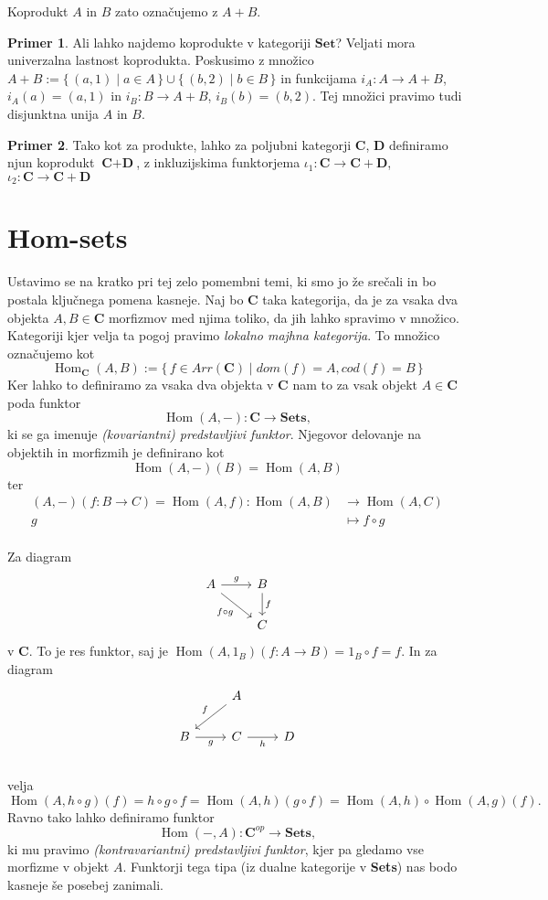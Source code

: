 \documentclass[12pt,a4paper]{book}
\theoremstyle{definition}
\theoremstyle{plain}
\theoremstyle{definition}
\newtheorem{primer}{Primer}[section]
\theoremstyle{remark}
\newcommand{\cat}[1]{\textbf{#1}}
\DeclareMathOperator{\Hom}{Hom}
\renewcommand{\set}[1]{\{\,#1\,\}}
\begin{document}
Koprodukt $A$ in $B$ zato označujemo z $A + B$.
\begin{primer}
Ali lahko najdemo koprodukte v kategoriji $\cat{Set}$? 
Veljati mora univerzalna lastnost koprodukta.
Poskusimo z množico $A+B := \set{(a,1) \mid a \in A} \cup \set{(b,2) \mid b \in B}$ in funkcijama $i_A : A \to A + B$, $i_A(a) = (a,1)$ in $i_B : B \to A+B$, $i_B(b) = (b,2)$. Tej množici pravimo tudi disjunktna unija $A$ in $B$.
\end{primer}

\begin{primer}
Tako kot za produkte, lahko za poljubni kategorji $\cat{C}$, $\cat{D}$ definiramo njun koprodukt $\cat{C} + \cat{D}$, z inkluzijskima funktorjema $\iota_1 : \cat{C} \to \cat{C} + \cat{D}$, $\iota_2 : \cat{C} \to \cat{C} + \cat{D}$
\end{primer}

\section{Hom-sets}
Ustavimo se na kratko pri tej zelo pomembni temi, ki smo jo že srečali in bo postala ključnega pomena kasneje. Naj bo $\cat{C}$ taka kategorija, da je za vsaka dva objekta $A,B \in \cat{C}$ morfizmov med njima toliko, da jih lahko spravimo v množico. Kategoriji kjer velja ta pogoj pravimo \textit{lokalno majhna kategorija}. To množico označujemo kot
$$\Hom_{\cat{C}}(A,B) := \set{f \in Arr(\cat{C}) \mid dom(f) = A, cod(f) = B}$$
Ker lahko to definiramo za vsaka dva objekta v $\cat{C}$ nam to za vsak objekt $A \in \cat{C}$ poda funktor
$$\Hom(A,-) : \cat{C} \to \cat{Sets},$$
ki se ga imenuje \emph{(kovariantni) predstavljivi funktor}. Njegovor delovanje na objektih in morfizmih je definirano kot
$$\Hom(A,-)(B) = \Hom(A,B)$$
ter
\begin{align*}
(A,-)(f : B \to C) = \Hom(A,f): \Hom(A,B) &\to \Hom(A,C) \\
g &\mapsto f \circ g \\
\end{align*}

Za diagram 
$$ \begin{tikzcd}
A \ar[r, "g"] \ar[rd, "f \circ g"'] & B \ar[d, "f"] \\
& C
\end{tikzcd} $$
v $\cat{C}$.
To je res funktor, saj je $\Hom(A,1_B)(f:A \to B) = 1_B \circ f = f$. In za diagram 
$$ \begin{tikzcd}
& A \ar[dl, "f"'] & \\
B \ar[r, "g"'] & C \ar[r, "h"'] & D \\
\end{tikzcd} $$
velja
$$
\Hom(A,h \circ g)(f) = h \circ g \circ f = \Hom(A,h)(g \circ f) = \Hom(A,h) \circ \Hom(A,g)(f).
$$
Ravno tako lahko definiramo funktor
$$\Hom(-,A) : \cat{C}^{op} \to \cat{Sets},$$
ki mu pravimo \emph{(kontravariantni) predstavljivi funktor},
kjer pa gledamo vse morfizme v objekt $A$. Funktorji tega tipa (iz dualne kategorije v \cat{Sets}) nas bodo kasneje še posebej zanimali.
\end{document}
